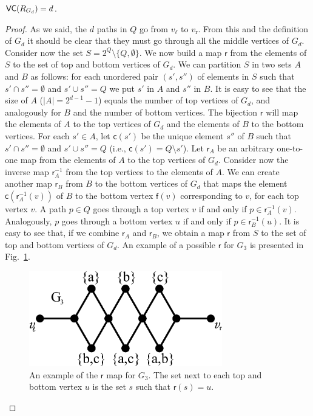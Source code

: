 \begin{lemma}\label{lem:vcdimlowbound}
  $\mathsf{VC}(R_{G_d})=d$.
\end{lemma}
\begin{proof}
  As we said, the $d$ paths in $Q$  go from $v_\ell$ to $v_\mathrm{r}$.
  From this and the definition of $G_d$ it should be clear that they must go through
  all the middle vertices of $G_d$. Consider now the set
  $S=2^Q\setminus\{Q,\emptyset\}$. We now build a map $\mathsf{r}$
  from the elements of $S$ to the set of top and bottom vertices of $G_d$. We can
  partition $S$ in two sets $A$ and $B$ as follows: %
  for each unordered pair $(s',s'')$ of
  elements in $S$ such that $s'\cap s''=\emptyset$ and $s'\cup s''=Q$
  we put $s'$ in $A$ and $s''$ in $B$. It is
  easy to see that the size of $A$ ($|A|=2^{d-1}-1$) equals the number of top
  vertices of $G_d$, and analogously for $B$ and the number of bottom vertices.
  The bijection $\mathsf{r}$ will map the
  elements of $A$ to the top vertices of $G_d$ and the elements of $B$ to the
  bottom vertices. For each $s'\in A$, let $\mathsf{c}(s')$ be the unique element $s''$
  of $B$ such that $s'\cap s''=\emptyset$ and $s'\cup s''=Q$ (i.e.,
  $\mathsf{c}(s')=Q\setminus s'$). 
  Let $\mathsf{r}_A$ be an arbitrary one-to-one map from the elements of $A$ to
  the top vertices of $G_d$. Consider now the inverse map $\mathsf{r}^{-1}_A$
  from the top vertices to the elements of $A$. We can create another map
  $\mathsf{r}_B$ from $B$ to the
  bottom vertices of $G_d$ that maps the element
  $\mathsf{c}(\mathsf{r}^{-1}_A(v))$ of $B$ to the bottom vertex $\mathsf{f}(v)$
  corresponding to $v$, for each top vertex $v$. A path $p\in Q$ goes through
  a top vertex $v$ if and only if $p\in\mathsf{r}^{-1}_A(v)$. Analogously, $p$
  goes through a bottom vertex $u$ if and only if $p\in\mathsf{r}^{-1}_B(u)$.
  It is easy to see that, if we combine $\mathsf{r}_A$ and
  $\mathsf{r}_B$, we obtain a map $\mathsf{r}$ from $S$ to the set of
  top and bottom vertices of $G_d$. An example of a possible $\mathsf{r}$ for
  $G_3$ is presented in Fig.~\ref{fig:centrsamplmapexample}.

  \begin{figure}[ht]
    \centering
    \includegraphics[width=0.75\textwidth,keepaspectratio]{centrsampl/figures/eps/tight-mapexample}
    \caption{An example of the $\mathsf{r}$ map for $G_3$. The set next to
    each top and bottom vertex $u$ is the set $s$ such that $\mathsf{r}(s)=u$.}
    \label{fig:centrsamplmapexample}
  \end{figure}
  

\end{proof}
